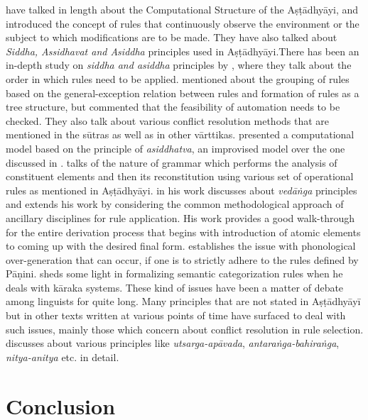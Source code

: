 \documentclass[a4paper,11pt,twoside,openright]{report}
\begin{document}
 have talked in length about the Computational Structure of the Aṣṭādhyāyi, and introduced the concept of rules that continuously observe the environment or the subject to which modifications are to be made. They have also talked about \textsl{ Siddha, Assidhavat and Asiddha } principles used in Aṣṭādhyāyi.There has been an in-depth study on \textsl{ siddha and asiddha} principles by , where they talk about the order in which rules need to be applied.  mentioned about the grouping of rules based on the general-exception relation between rules and formation of rules as a tree structure, but commented that the feasibility of automation needs to be checked.  They also talk about various conflict resolution methods that are mentioned in the sūtras as well as in other vārttikas.  presented a computational model based on the principle of \textsl{ asiddhatva}, an improvised model over the one discussed in .  talks of the nature of grammar which performs the analysis of constituent elements and then its reconstitution using various set of operational rules as mentioned in Aṣṭādhyāyi.  in his work discusses about \textsl{ vedāṅga } principles and extends his work by considering the common methodological approach of ancillary disciplines for rule application. His work provides a good walk-through for the entire derivation process that begins with introduction of atomic elements to coming up with the desired final form.   establishes the issue with phonological over-generation that can occur, if one is to strictly adhere to the rules defined by Pāṇini.  sheds some light in formalizing semantic categorization rules when he deals with kāraka systems. These kind of issues have been a matter of debate among linguists for quite long. Many principles that are not stated in Aṣṭādhyāyī but in other texts written at various points of time have surfaced to deal with such issues, mainly those which concern about conflict resolution in rule selection.  discusses  about various principles like \textsl{ utsarga-apāvada}, \textsl{ antaraṅga-bahiraṅga}, \textsl{ nitya-anitya} etc. in detail.

\section{Conclusion}
\label{concSec}
\end{document}
